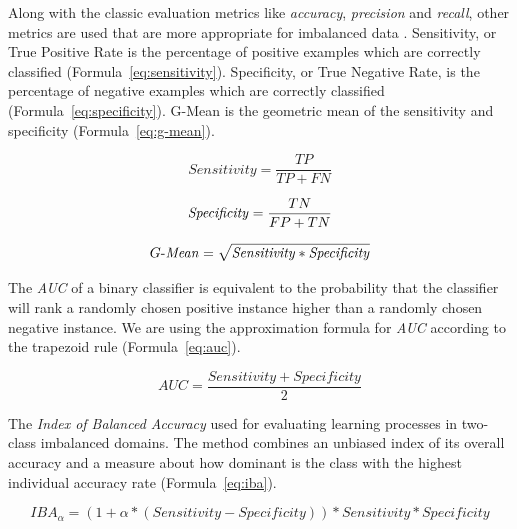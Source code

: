 Along with the classic evaluation metrics like \textit{accuracy}, \textit{precision} and \textit{recall}, other metrics are used that are more appropriate for imbalanced data \cite{comparison_metrics, iba_metric}. 
Sensitivity, or True Positive Rate is the percentage of positive examples which
are correctly classified (Formula~\ref{eq:sensitivity}).
Specificity, or True Negative Rate, is the percentage of negative examples which are correctly classified (Formula~\ref{eq:specificity}).
G-Mean is the geometric mean of the sensitivity and specificity (Formula~\ref{eq:g-mean}).


\begin{equation} \label{eq:sensitivity}
\mathit{Sensitivity} = \frac{TP}{TP + FN}
\end{equation}

\begin{equation} \label{eq:specificity}
\mathit{Specificity} = \frac{TN}{FP + TN}\\
\end{equation}

\begin{equation} \label{eq:g-mean}
G{\text -}\mathit{Mean} = \sqrt{ \mathit{Sensitivity} * \mathit{Specificity}}
\end{equation}

The \textit{AUC} of a binary classifier is equivalent to the probability that the classifier will rank a randomly chosen positive instance higher than a randomly chosen negative instance. We are using the approximation formula for \textit{AUC} according to the trapezoid rule (Formula~\ref{eq:auc}).

\begin{equation} \label{eq:auc}
\mathit{AUC} = \frac{\mathit{Sensitivity} + \mathit{Specificity}}{2} 
\end{equation} 

The \textit{Index of Balanced Accuracy} used for evaluating learning processes in two-class imbalanced domains. The
method combines an unbiased index of its overall accuracy and a measure about
how dominant is the class with the highest individual accuracy rate (Formula~\ref{eq:iba}).

\begin{equation} \label{eq:iba}
\mathit{IBA_{\alpha}} = (1 + \alpha * (\mathit{Sensitivity} - \mathit{Specificity})) * \mathit{Sensitivity} * \mathit{Specificity}
\end{equation} 



